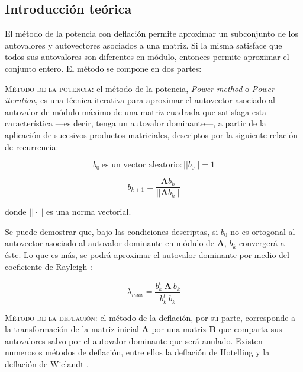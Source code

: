 
\vspace{1em}
\subsection{Introducción teórica} El método de la potencia con deflación permite aproximar un subconjunto de los autovalores y autovectores asociados a una matriz. Si la misma satisface que todos sus autovalores son diferentes en módulo, entonces permite aproximar el conjunto entero. El método se compone en dos partes:


\vspace{2em}
\noindent \textsc{Método de la potencia}: el método de la potencia, \textit{Power method} o \textit{Power iteration}, es una técnica iterativa para aproximar el autovector asociado al autovalor de módulo máximo de una matriz cuadrada que satisfaga esta característica ---es decir, tenga un autovalor dominante---, a partir de la aplicación de sucesivos productos matriciales, descriptos por la siguiente relación de recurrencia:

\begin{equation*}
    b_0\ \text{es un vector aleatorio} : ||b_0|| = 1
\end{equation*}

\begin{equation} \label{eqpotencia}
    b_{k+1} = \frac{\mathbf{A}b_k}{||\mathbf{A}b_k||}
\end{equation}

\vspace{1em}
\noindent donde $|| \cdot ||$ es una norma vectorial.

\vspace{1em}
Se puede demostrar  que, bajo las condiciones descriptas, si $b_0$ no es ortogonal al autovector asociado al autovalor dominante en módulo de \textbf{A}, $b_k$ convergerá a éste. Lo que es más, se podrá aproximar el autovalor dominante por medio del coeficiente de Rayleigh :

\vspace{1em}
\begin{equation} \label{rayleigh}
    \lambda_{max} = \frac{b_k^t\ \mathbf{A}\ b_k}{b_k^t\ b_k}
\end{equation}


\vspace{3em}
\noindent \textsc{Método de la deflación}: el método de la deflación, por su parte, corresponde a la transformación de la matriz inicial \textbf{A} por una matriz \textbf{B} que comparta sus autovalores salvo por el autovalor dominante que será anulado. Existen numerosos métodos de deflación, entre ellos la deflación de Hotelling  y la deflación de Wielandt . 

